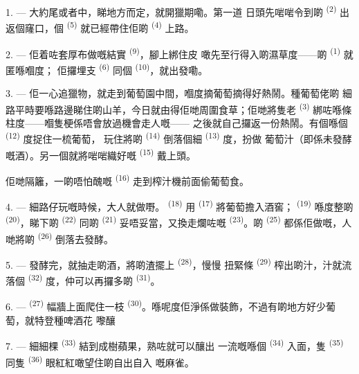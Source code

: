 1. --- 大約尾或者中，睇地方而定，就開獵期嘞。第一道
日頭先啱啱令到啲 \textsuperscript{(2)} 出返個窿口，個
\textsuperscript{(5)} 就已經帶住佢啲 \textsuperscript{(4)} 上路。

2. --- 佢着咗套厚布做嘅結實 \textsuperscript{(9)}，腳上綁住皮
噉先至行得入啲濕草度——啲 \textsuperscript{(1)} 就匿喺嗰度；
佢攞埋支 \textsuperscript{(6)} 同個 \textsuperscript{(10)}，就出發嘞。

3. --- 佢一心追獵物，就走到葡萄園中間，嗰度摘葡萄摘得好熱鬧。種葡萄佬啲
細路平時要喺路邊睇住啲山羊，今日就由得佢哋周圍食草；佢哋將隻老
 \textsuperscript{(3)} 綁咗喺條柱度——嗰隻梗係唔會放過機會走人嘅——
之後就自己攞返一份熱鬧。有個喺個 \textsuperscript{(12)} 度捉住一梳葡萄，
玩住將啲 \textsuperscript{(14)} 倒落個細 \textsuperscript{(13)} 度，扮做
葡萄汁（即係未發酵嘅酒）。另一個就將啱啱織好嘅 \textsuperscript{(15)}
戴上頭。

佢哋隔籬，一啲唔怕醜嘅 \textsuperscript{(16)} 走到榨汁機前面偷葡萄食。

4. --- 細路仔玩嘅時候，大人就做嘢。 \textsuperscript{(18)} 用
 \textsuperscript{(17)} 將葡萄擔入酒窖； \textsuperscript{(19)}
喺度整啲 \textsuperscript{(20)}，睇下啲 \textsuperscript{(22)} 同啲
 \textsuperscript{(21)} 妥唔妥當，又換走爛咗嘅
\textsuperscript{(23)}。啲 \textsuperscript{(25)} 都係佢做嘅，人哋將啲
 \textsuperscript{(26)} 倒落去發酵。

5. --- 發酵完，就抽走啲酒，將啲渣擺上 \textsuperscript{(28)}，慢慢
扭緊條 \textsuperscript{(29)} 榨出啲汁，汁就流落個
\textsuperscript{(32)} 度，仲可以再攞多啲 \textsuperscript{(31)}。

\VUsaut{6.0mm}
\VUsaut{3.4mm}

6. ---  \textsuperscript{(27)} 幅牆上面爬住一枝
\textsuperscript{(30)}。喺呢度佢淨係做裝飾，不過有啲地方好少葡萄，就特登種啤酒花
嚟釀

7. --- 細細棵 \textsuperscript{(33)} 結到成樹蘋果，熟咗就可以釀出
一流嘅喺個 \textsuperscript{(34)} 入面，隻
\textsuperscript{(35)} 同隻 \textsuperscript{(36)} 眼紅紅噉望住啲自出自入
嘅麻雀。

